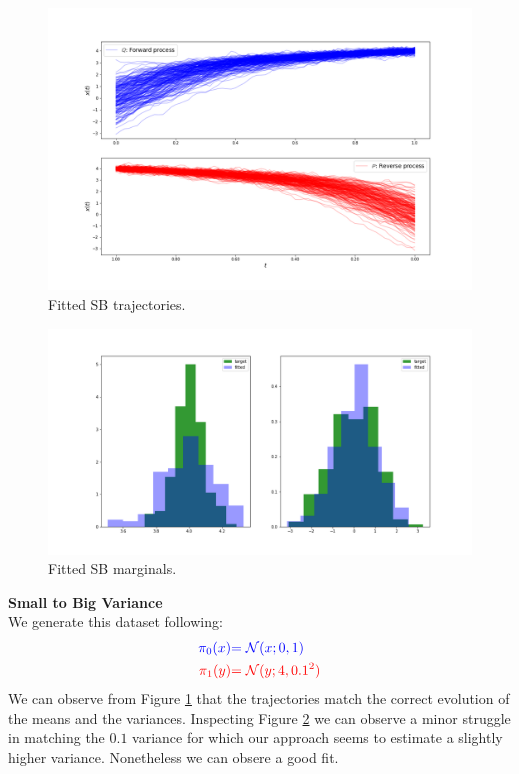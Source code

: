 \documentclass[a4paper,12pt,twoside,openright]{report}
\theoremstyle{definition}
\begin{document}
\begin{figure}
    \centering
    \includegraphics[scale=0.5,trim={4.3cm 1cm 2.5cm 0}, clip]{images/GP/gp_bigvar_trajectories.png}
    \caption{ Fitted SB trajectories.  }
    \label{fig:bigvar200trajectroies}
\end{figure}
\begin{figure}
    \centering
    \includegraphics[scale=0.3,trim={4.3cm 1cm 2.5cm 0}, clip]{images/GP/gp_bigvar_boundaires.png}
    \caption{ Fitted SB marginals.  }
    \label{fig:bigvar200boundaries}
\end{figure}
\textbf{Small to Big Variance}\\
We generate this dataset following:
\begin{align*}
\color{blue}{\pi_0(x)} &\color{blue}{= {\mathcal{N}}(x; 0,  1)} \\
    \color{red}{\pi_1(y)} &\color{red}{= {\mathcal{N}}(y; 4, 0.1^2)} 
\end{align*}
We can observe from Figure \ref{fig:bigvar200trajectroies} that the trajectories match the correct evolution of the means and the variances. Inspecting Figure \ref{fig:bigvar200boundaries} we can observe a minor struggle in matching the $0.1$ variance for which our approach seems to estimate a slightly higher variance. Nonetheless we can obsere a good fit.
\end{document}
